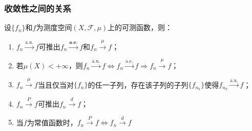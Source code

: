 \subsubsection{收敛性之间的关系}
\begin{theorem}\label{theo:a.e.a.u.mu.d}
	设$\{f_n\}$和$f$为测度空间$(X,\mathscr{F},\mu)$上的可测函数，则：
	\begin{enumerate}
		\item $f_n\overset{\text{a.u.}}{\longrightarrow}f$可推出$f_n\overset{\textbf{a.e.}}{\longrightarrow}f$和$f_n\overset{\mu}{\longrightarrow}f$；
		\item 若$\mu(X)<+\infty$，则$f_n\overset{\text{a.u.}}{\longrightarrow}f\iff f_n\overset{\text{a.e.}}{\longrightarrow}f\Rightarrow f_n\overset{\mu}{\longrightarrow}f$；
		\item $f_n\overset{\mu}{\longrightarrow}f$当且仅当对$\{f_n\}$的任一子列，存在该子列的子列$\{f_{n_k}\}$使得$f_{n_k}\overset{\text{a.u.}}{\longrightarrow}f$；
		\item $f_n\overset{P}{\longrightarrow}f$可推出$f_n\overset{d}{\longrightarrow}f$；
		\item 当$f$为常值函数时，$f_n\overset{P}{\longrightarrow}f\iff f_n\overset{d}{\longrightarrow}f$
	\end{enumerate}
\end{theorem}
